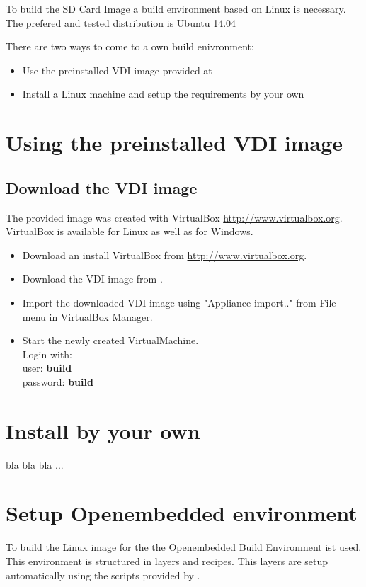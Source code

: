 To build the \ov SD Card Image a build environment based on Linux is necessary.
The prefered and tested distribution is Ubuntu 14.04

There are two ways to come to a own build enivronment:

\begin{itemize}
	\item Use the preinstalled VDI image provided at \ovwebsite{}
	\item Install a Linux machine and setup the requirements by your own
\end{itemize}

\section{Using the preinstalled VDI image}

\subsection{Download the VDI image}
The provided image was created with VirtualBox\textsuperscript{\textcopyright} \url{http://www.virtualbox.org}. VirtualBox is available for Linux as well as for Windows\textsuperscript{\textcopyright}.

\begin{itemize}
	\item Download an install VirtualBox\textsuperscript{\textcopyright} from \url{http://www.virtualbox.org}.
	\item Download the VDI image from \ovwebsite{} .
	\item Import the downloaded VDI image using "Appliance import.." from File menu in VirtualBox Manager.
	\item Start the newly created VirtualMachine. \\
		Login with: \\
			user: \textbf{build} \\
			password: \textbf{build} \\
\end{itemize}




\section{Install by your own}

bla bla bla ...


\section{Setup Openembedded environment}
To build the Linux image for the \ovfc the Openembedded Build Environment ist used. This environment is structured in layers and recipes. This layers are setup automatically using the scripts provided by \ovwebsite{}.

